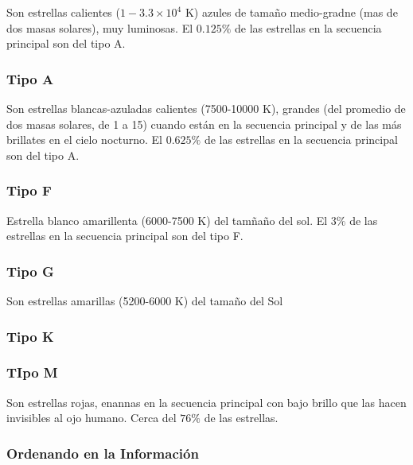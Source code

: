 Son estrellas calientes ($1-3.3 \times 10^4$ K) azules de tamaño medio-gradne (mas de dos masas solares), muy luminosas. El $0.125\%$ de las estrellas en la secuencia principal son del tipo A.

\subsubsection{Tipo A}

Son estrellas blancas-azuladas calientes (7500-10000 K), grandes (del promedio de dos masas solares, de 1 a 15) cuando están en la secuencia principal y de las más brillates en el cielo nocturno.  El $0.625\%$ de las estrellas en la secuencia principal son del tipo A.

\subsubsection{Tipo F}

Estrella blanco amarillenta (6000-7500 K) del tamñaño del sol. El $3\%$ de las estrellas en la secuencia principal son del tipo F.

\subsubsection{Tipo G}

Son estrellas amarillas (5200-6000 K) del tamaño del Sol

\subsubsection{Tipo K}

\subsubsection{TIpo M}

Son estrellas rojas, enannas en la secuencia principal con bajo brillo que las hacen invisibles al ojo humano. Cerca del $76\%$ de las estrellas.

\subsubsection{Ordenando en la Información}


